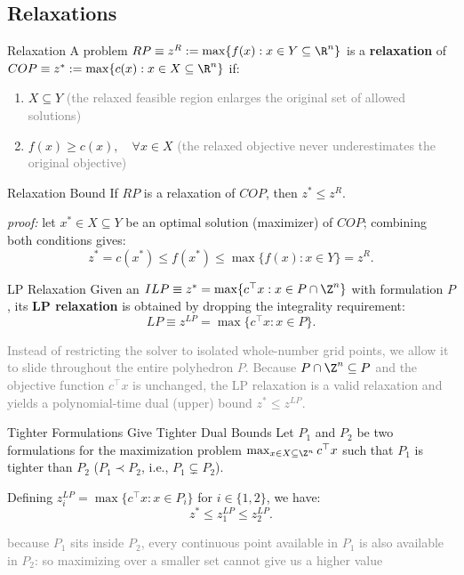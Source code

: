 \documentclass[a4paper, 11pt]{report}
\begin{document}
\subsection{Relaxations}

\begin{defframe}{Relaxation}{}
    A problem $RP \equiv z^R := \max \{ f(x) : x \in Y \subseteq \R^n \}$ is a \textbf{relaxation} of $COP \equiv z^* := \max \{ c(x) : x \in X \subseteq \R^n \}$ if:
    \begin{enumerate}
        \item $X \subseteq Y$ \quad \textcolor{gray}{(the relaxed feasible region enlarges the original set of allowed solutions)}
        \item $f(x) \geq c(x), \quad \forall x \in X$ \quad \textcolor{gray}{(the relaxed objective never underestimates the original objective)}
    \end{enumerate}
\end{defframe}

\begin{thmframe}{Relaxation Bound}{}
If $RP$ is a relaxation of $COP$, then $z^* \leq z^R$.


\textit{proof:} let $x^* \in X \subseteq Y$ be an optimal solution (maximizer) of $COP$; combining both conditions gives:
$$ z^* = c(x^*) \leq f(x^*) \leq \max \{ f(x) : x \in Y \} = z^R. $$
\end{thmframe}

\begin{defframe}{LP Relaxation}{}
    Given an $ILP \equiv z^* = \max \{ c^\top x : x \in P \cap \Z^n \}$ with formulation $P$, its \textbf{LP relaxation} is obtained by dropping the integrality requirement:
    $$ LP \equiv z^{LP} = \max \{ c^\top x : x \in P \}. $$

    \textcolor{gray}{Instead of restricting the solver to isolated whole-number grid points, we allow it to slide throughout the entire polyhedron $P$. Because $P \cap \Z^n \subseteq P$ and the objective function $c^\top x$ is unchanged, the LP relaxation is a valid relaxation and yields a polynomial-time dual (upper) bound $z^* \leq z^{LP}$.}
\end{defframe}

\begin{thmframe}{Tighter Formulations Give Tighter Dual Bounds}{}
Let $P_1$ and $P_2$ be two formulations for the maximization problem $\max_{x \in X \subseteq \Z^n} c^\top x$ such that $P_1$ is tighter than $P_2$ ($P_1 \prec P_2$, i.e., $P_1 \subsetneq P_2$). 

Defining $z_i^{LP} = \max \{ c^\top x : x \in P_i \}$ for $i \in \{1,2\}$, we have:
$$ z^* \leq z_1^{LP} \leq z_2^{LP}. $$

\textcolor{gray}{because $P_1$ sits inside $P_2$, every continuous point available in $P_1$ is also available in $P_2$: so maximizing over a smaller set cannot give us a higher value}
\end{thmframe}
\end{document}
